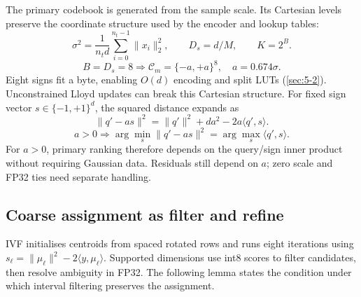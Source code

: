 The primary codebook is generated from the sample scale. Its Cartesian
levels preserve the coordinate structure used by the encoder and lookup
tables:
\begin{equation}
 \sigma^2=\frac{1}{n_t d}\sum_{i=0}^{n_t-1}\|x_i\|_2^2,
 \qquad D_s=d/M,\qquad K=2^B.
 \label{eq:4-scale}
\end{equation}
\[
 B=D_s=8\Longrightarrow
 \mathcal C_m=\{-a,+a\}^{8},\quad a=0.674\sigma.
\]
Eight signs fit a byte, enabling $O(d)$ encoding and split LUTs
\cite{jhq} (\cref{sec:5-2}). Unconstrained Lloyd updates can break this
Cartesian structure. For fixed sign vector $s\in\{-1,+1\}^d$, the
squared distance expands as
\begin{equation}
 \|q'-a s\|^2=\|q'\|^2+da^2-2a\langle q',s\rangle.
 \label{eq:4-sign-ranking}
\end{equation}
\[
 a>0\Longrightarrow
 \arg\min_s\|q'-as\|^2=\arg\max_s\langle q',s\rangle.
\]
For $a>0$, primary ranking therefore depends on the query/sign inner
product without requiring Gaussian data. Residuals still depend on $a$;
zero scale and FP32 ties need separate handling.

\subsection{Coarse assignment as filter and refine}

IVF initialises centroids from spaced rotated rows and runs eight
iterations using $s_\ell=\|\mu_\ell\|^2-2\langle y,\mu_\ell\rangle$.
Supported dimensions use int8 scores to filter candidates, then resolve
ambiguity in FP32. The following lemma states the condition under which
interval filtering preserves the assignment.

